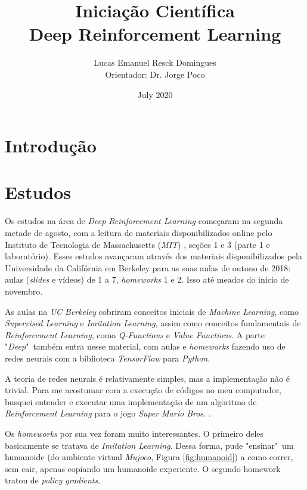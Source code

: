 \documentclass{article}
\title{Iniciação Científica\\
Deep Reinforcement Learning}
\author{Lucas Emanuel Resck Domingues\\
Orientador: Dr. Jorge Poco}
\date{July 2020}
\begin{document}
    \maketitle

    \tableofcontents

    \section{Introdução}
    
    \section{Estudos}

        Os estudos na área de \textit{Deep Reinforcement Learning}
        começaram na segunda metade de agosto, com a leitura de
        materiais disponibilizados online pelo Instituto de Tecnologia
        de Massachusetts (\textit{MIT})
        , seções 1 e 3 (parte 1 e laboratório). Esses estudos avançaram através dos materiais
        disponibilizados pela Universidade da Califórnia em Berkeley
        para as suas aulas de outono de 2018: aulas (\textit{slides} e vídeos) de 1 a 7,
        \textit{homeworks} 1 e 2. Isso até meados do início de novembro.

        As aulas na \textit{UC Berkeley} cobriram conceitos iniciais
        de \textit{Machine Learning}, como \textit{Supervised Learning} e \textit{Imitation
        Learning}, assim como conceitos fundamentais de \textit{Reinforcement Learning},
        como \textit{Q-Functions} e \textit{Value Functions}. A parte "\textit{Deep}"\ também entra
        nesse material, com aulas e \textit{homeworks} fazendo uso de redes neurais
        com a biblioteca \textit{TensorFlow} para \textit{Python}.

        A teoria de redes neurais é relativamente simples, mas a
        implementação não é trivial. Para me acostumar com a execução de códigos
        no meu computador, busquei entender e executar uma implementação de 
        um algoritmo de \textit{Reinforcement Learning} para o jogo \textit{Super
        Mario Bros.}
        .

        Os \textit{homeworks} por sua vez foram muito interessantes.
        O primeiro deles basicamente se tratava de \textit{Imitation Learning}.
        Dessa forma, pude "ensinar"\ um humanoide (do ambiente virtual \textit{Mujoco}, Figura \ref{fig:humanoid}) a como correr, sem cair,
        apenas copiando um humanoide experiente. O segundo homework tratou de 
        \textit{policy gradients}.
\end{document}
